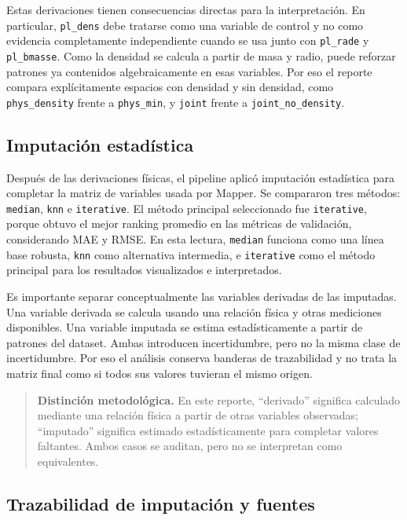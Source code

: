 Estas derivaciones tienen consecuencias directas para la interpretación. En particular, \texttt{pl\_dens} debe tratarse como una variable de control y no como evidencia completamente independiente cuando se usa junto con \texttt{pl\_rade} y \texttt{pl\_bmasse}. Como la densidad se calcula a partir de masa y radio, puede reforzar patrones ya contenidos algebraicamente en esas variables. Por eso el reporte compara explícitamente espacios con densidad y sin densidad, como \texttt{phys\_density} frente a \texttt{phys\_min}, y \texttt{joint} frente a \texttt{joint\_no\_density}.

\subsection*{Imputación estadística}

Después de las derivaciones físicas, el pipeline aplicó imputación estadística para completar la matriz de variables usada por Mapper. Se compararon tres métodos: \texttt{median}, \texttt{knn} e \texttt{iterative}. El método principal seleccionado fue \texttt{iterative}, porque obtuvo el mejor ranking promedio en las métricas de validación, considerando MAE y RMSE. En esta lectura, \texttt{median} funciona como una línea base robusta, \texttt{knn} como alternativa intermedia, e \texttt{iterative} como el método principal para los resultados visualizados e interpretados.

Es importante separar conceptualmente las variables derivadas de las imputadas. Una variable derivada se calcula usando una relación física y otras mediciones disponibles. Una variable imputada se estima estadísticamente a partir de patrones del dataset. Ambas introducen incertidumbre, pero no la misma clase de incertidumbre. Por eso el análisis conserva banderas de trazabilidad y no trata la matriz final como si todos sus valores tuvieran el mismo origen.

\begin{quote}
\textbf{Distinción metodológica.} En este reporte, ``derivado'' significa calculado mediante una relación física a partir de otras variables observadas; ``imputado'' significa estimado estadísticamente para completar valores faltantes. Ambos casos se auditan, pero no se interpretan como equivalentes.
\end{quote}

\subsection*{Trazabilidad de imputación y fuentes}

